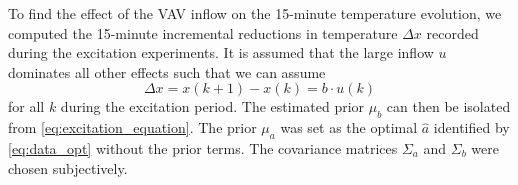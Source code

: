 To find the effect of the VAV inflow on the 15-minute temperature evolution, we computed the 15-minute incremental reductions in temperature $\Delta x$ recorded during the excitation experiments. 
It is assumed that the large inflow $u$ dominates all other effects such that we can assume
\begin{equation}\label{eq:excitation_equation}
\Delta x = x(k+1) - x(k) = b\cdot u(k)
\end{equation}
for all $k$ during the excitation period. The estimated prior $\mu_b$ can then be isolated from \eqref{eq:excitation_equation}. The prior $\mu_a$ was set as the optimal $\hat{a}$ identified by \eqref{eq:data_opt} without the prior terms. The covariance matrices $\Sigma_a$ and $\Sigma_b$ were chosen subjectively. 

